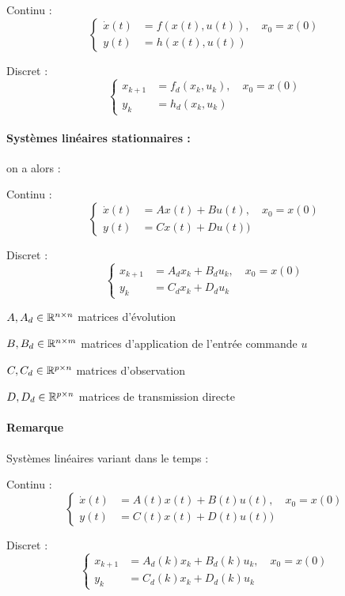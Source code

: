 \documentclass[main.tex]{subfiles}
\begin{document}
\begin{multicols}{2}
Continu :
\[
\left\{
\begin{array}{ll}
\dot{x}(t) & = f(x(t),u(t)), \quad x_0=x(0) \\
y(t) & = h(x(t),u(t))
\end{array}
\right.
\]

Discret :
\[
\left\{
\begin{array}{ll}
x_{k+1} & = f_d(x_k,u_k), \quad x_0=x(0) \\
y_k & = h_d(x_k,u_k)
\end{array}
\right.
\]
\end{multicols}


\paragraph{Systèmes linéaires stationnaires :} on a alors :
 \begin{multicols}{2}
Continu :
\[
\left\{
\begin{array}{ll}
\dot{x}(t) & = Ax(t)+Bu(t), \quad x_0=x(0) \\
y(t) & = Cx(t)+Du(t))
\end{array}
\right.
\]

Discret :
\[
\left\{
\begin{array}{ll}
x_{k+1} & = A_d x_k + B_d u_k, \quad x_0=x(0) \\
y_k & = C_d x_k + D_d u_k
\end{array}
\right.
\]
\end{multicols}

$A,A_d \in \mathbb{R}^{n\times n}$ matrices d'évolution

$B,B_d\in \mathbb{R}^{n\times m}$ matrices d'application de l'entrée commande $u$

$C,C_d \in \mathbb{R}^{p \times n}$ matrices d’observation

$D,D_d \in \mathbb{R}^{p\times n}$ matrices de transmission directe

\paragraph{Remarque} Systèmes linéaires variant dans le temps :

\begin{multicols}{2}
Continu :
\[
\left\{
\begin{array}{ll}
\dot{x}(t) & = A(t)x(t)+B(t)u(t), \quad x_0=x(0) \\
y(t) & = C(t)x(t)+D(t)u(t))
\end{array}
\right.
\]

Discret :
\[
\left\{
\begin{array}{ll}
x_{k+1} & = A_d(k) x_k + B_d(k) u_k, \quad x_0=x(0) \\
y_k & = C_d(k) x_k + D_d(k) u_k
\end{array}
\right.
\]
\end{multicols}
\end{document}
